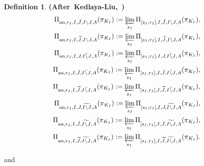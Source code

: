 \documentclass[12pt]{amsart}
\theoremstyle{definition}
\newtheorem{definition}[theorem]{Definition}
\numberwithin{equation}{section}
\begin{document}
\begin{definition} \mbox{\bf{(After Kedlaya-Liu, \cite[Definition 5.2.1]{KL2})}}
\begin{align}
\Pi_{\mathrm{an},r_I,I,\breve{J},I\backslash J,A}(\pi_{K_I}):=\varprojlim_{s_I}\Pi_{[s_I,r_I],I,\breve{J},I\backslash J,A}(\pi_{K_I}),\\	
\Pi_{\mathrm{an},r_I,I,\widetilde{J},I\backslash J,A}(\pi_{K_I}):=\varprojlim_{s_I} \Pi_{[s_I,r_I],I,\widetilde{J},I\backslash J,A}(\pi_{K_I}),\\
\Pi_{\mathrm{an},r_I,I,J,\breve{I\backslash J},A}(\pi_{K_I}):=\varprojlim_{s_I}\Pi_{[s_I,r_I],I,J,\breve{I\backslash J},A}(\pi_{K_I}),\\	
\Pi_{\mathrm{an},r_I,I,\breve{J},\breve{I\backslash J},A}(\pi_{K_I}):=\varprojlim_{s_I} \Pi_{[s_I,r_I],I,\breve{J},\breve{I\backslash J},A}(\pi_{K_I}),\\	
\Pi_{\mathrm{an},r_I,I,\widetilde{J},\breve{I\backslash J},A}(\pi_{K_I}):=\varprojlim_{s_I} \Pi_{[s_I,r_I],I,\widetilde{J},\breve{I\backslash J},A}(\pi_{K_I}),\\
\Pi_{\mathrm{an},r_I,I,J,\widetilde{I\backslash J},A}(\pi_{K_I}):=\varprojlim_{s_I} \Pi_{[s_I,r_I],I,J,\widetilde{I\backslash J},A}(\pi_{K_I}),\\	
\Pi_{\mathrm{an},r_I,I,\breve{J},\widetilde{I\backslash J},A}(\pi_{K_I}):=\varprojlim_{s_I} \Pi_{[s_I,r_I],I,\breve{J},\widetilde{I\backslash J},A}(\pi_{K_I}),\\	
\Pi_{\mathrm{an},r_I,I,\widetilde{J},\widetilde{I\backslash J},A}(\pi_{K_I}):=\varprojlim_{s_I} \Pi_{[s_I,r_I],I,\widetilde{J},\widetilde{I\backslash J},A}(\pi_{K_I}).	
\end{align}

and 


\end{definition}
\end{document}
